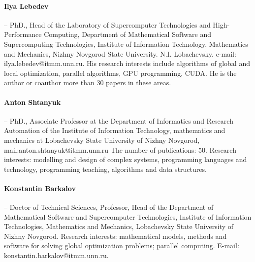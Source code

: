 \documentclass[a4paper,12pt,russian]{article}
\begin{document}
\paragraph{Ilya Lebedev} -- PhD., Head of the Laboratory of Supercomputer Technologies and High-Performance Computing, Department of Mathematical Software and Supercomputing Technologies, Institute of Information Technology, Mathematics and Mechanics, Nizhny Novgorod State University. N.I. Lobachevsky. e-mail: ilya.lebedev@itmm.unn.ru. His research interests include algorithms of global and local optimization, parallel algorithms, GPU programming, CUDA. He is the author or coauthor more than 30 papers in these areas.
\paragraph{Anton Shtanyuk} -- PhD., Associate Professor at the Department of Informatics and Research Automation of the Institute of Information Technology, mathematics and mechanics at Lobachevsky State University of Nizhny Novgorod, mail:anton.shtanyuk@itmm.unn.ru The number of publications: 50. Research interests: modelling and design of complex systems, programming languages and technology, programming teaching, algorithms and data structures.
\paragraph{Konstantin Barkalov} -- Doctor of Technical Sciences, Professor, Head of the Department of Mathematical Software and Supercomputer Technologies, Institute of Information Technologies, Mathematics and Mechanics, Lobachevsky State University of Nizhny Novgorod. Research interests: mathematical models, methods and software for solving global optimization problems; parallel computing. E-mail: konstantin.barkalov@itmm.unn.ru.
\end{document}
